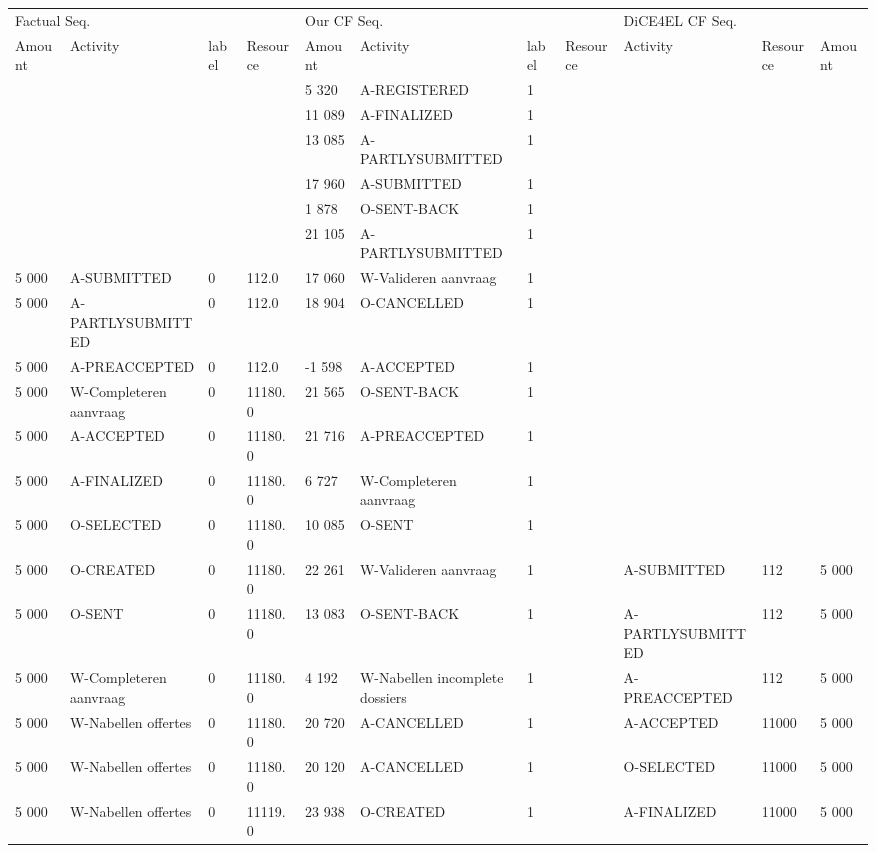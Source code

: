 \begin{tabular}{lllllllllll}
\toprule
\multicolumn{4}{l}{Factual Seq.} & \multicolumn{4}{l}{Our CF Seq.} & \multicolumn{3}{l}{DiCE4EL CF Seq.} \\
Amount & Activity & label & Resource & Amount & Activity & label & Resource & Activity & Resource & Amount \\
\midrule
 &  &  &  & 5 320 & A-REGISTERED & 1 &  &  &  &  \\
 &  &  &  & 11 089 & A-FINALIZED & 1 &  &  &  &  \\
 &  &  &  & 13 085 & A-PARTLYSUBMITTED & 1 &  &  &  &  \\
 &  &  &  & 17 960 & A-SUBMITTED & 1 &  &  &  &  \\
 &  &  &  & 1 878 & O-SENT-BACK & 1 &  &  &  &  \\
 &  &  &  & 21 105 & A-PARTLYSUBMITTED & 1 &  &  &  &  \\
5 000 & A-SUBMITTED & 0 & 112.0 & 17 060 & W-Valideren aanvraag & 1 &  &  &  &  \\
5 000 & A-PARTLYSUBMITTED & 0 & 112.0 & 18 904 & O-CANCELLED & 1 &  &  &  &  \\
5 000 & A-PREACCEPTED & 0 & 112.0 & -1 598 & A-ACCEPTED & 1 &  &  &  &  \\
5 000 & W-Completeren aanvraag & 0 & 11180.0 & 21 565 & O-SENT-BACK & 1 &  &  &  &  \\
5 000 & A-ACCEPTED & 0 & 11180.0 & 21 716 & A-PREACCEPTED & 1 &  &  &  &  \\
5 000 & A-FINALIZED & 0 & 11180.0 & 6 727 & W-Completeren aanvraag & 1 &  &  &  &  \\
5 000 & O-SELECTED & 0 & 11180.0 & 10 085 & O-SENT & 1 &  &  &  &  \\
5 000 & O-CREATED & 0 & 11180.0 & 22 261 & W-Valideren aanvraag & 1 &  & A-SUBMITTED & 112 & 5 000 \\
5 000 & O-SENT & 0 & 11180.0 & 13 083 & O-SENT-BACK & 1 &  & A-PARTLYSUBMITTED & 112 & 5 000 \\
5 000 & W-Completeren aanvraag & 0 & 11180.0 & 4 192 & W-Nabellen incomplete dossiers & 1 &  & A-PREACCEPTED & 112 & 5 000 \\
5 000 & W-Nabellen offertes & 0 & 11180.0 & 20 720 & A-CANCELLED & 1 &  & A-ACCEPTED & 11000 & 5 000 \\
5 000 & W-Nabellen offertes & 0 & 11180.0 & 20 120 & A-CANCELLED & 1 &  & O-SELECTED & 11000 & 5 000 \\
5 000 & W-Nabellen offertes & 0 & 11119.0 & 23 938 & O-CREATED & 1 &  & A-FINALIZED & 11000 & 5 000 \\

\end{tabular}
